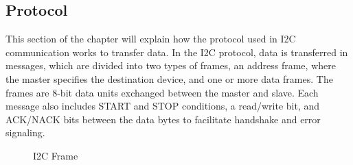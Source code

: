 \subsection{Protocol}
\label{chap:Back_I2C_Protocol}

This section of the chapter will explain how the protocol used in I2C communication 
works to transfer data. In the I2C protocol, data is transferred in messages, 
which are divided into two types of frames, an address frame, where the master 
specifies the destination device, and one or more data frames. The frames are 8-bit 
data units exchanged between the master and slave. Each message also includes 
START and STOP conditions, a read/write bit, and ACK/NACK bits between the 
data bytes to facilitate handshake and error signaling.

\begin{figure}[H]
    \centering
    \caption{I2C Frame}
    \label{fig:i2c_frame}
\end{figure}







